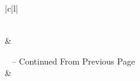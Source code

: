 \documentclass{report}
\begin{document}
\begin{spacing}{1.5}
\begin{longtable}{|c|l|}
\caption{Intel VMX Defined VM-Exits} \label{tab:long} \\

\hline {} &  \\ \hline 
\endfirsthead

%
{{\tablename\ \thetable{} -- Continued From Previous Page}} \\
\hline {} &  \\ \hline 
\endhead

\hline {} \\ \hline
\endfoot

\hline \hline
\endlastfoot


\end{longtable}
\end{spacing}
\end{document}
